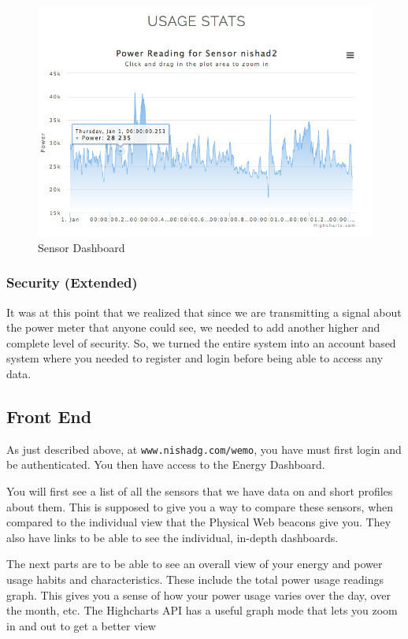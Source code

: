 \documentclass{sig-alternate-05-2015}
\begin{document}
\begin{figure}
	\centering
	\includegraphics[scale=.34]{phys2}
	\caption{Sensor Dashboard}
\end{figure}

\subsubsection{Security (Extended)}
It was at this point that we realized that since we are transmitting a signal about the power meter that anyone could see, we needed to add another higher and complete level of security. So, we turned the entire system into an account based system where you needed to register and login before being able to access any data.

\subsection{Front End}

As just described above, at \texttt{www.nishadg.com/wemo}, you have must first login and be authenticated. You then have access to the Energy Dashboard.

You will first see a list of all the sensors that we have data on and short profiles about them. This is supposed to give you a way to compare these sensors, when compared to the individual view that the Physical Web beacons give you. They also have links to be able to see the individual, in-depth dashboards.

The next parts are to be able to see an overall view of your energy and power usage habits and characteristics. These include the total power usage readings graph. This gives you a sense of how your power usage varies over the day, over the month, etc. The Highcharts API has a useful graph mode that lets you zoom in and out to get a better view
\end{document}
